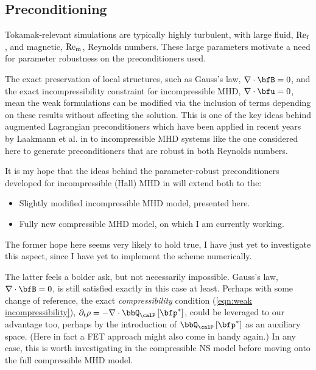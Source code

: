 \subsection*{Preconditioning}
    Tokamak-relevant simulations are typically highly turbulent, with large fluid, $\mathrm{Re}_{\mathrm{f}}$, and magnetic, $\mathrm{Re}_{\mathrm{m}}$, Reynolds numbers. These large parameters motivate a need for parameter robustness on the preconditioners used.

    The exact preservation of local structures, such as Gauss's law, $\nabla\cdot\bfB = 0$, and the exact incompressibility constraint for incompressible MHD, $\nabla\cdot\bfu = 0$, mean the weak formulations can be modified via the inclusion of terms depending on these results without affecting the solution. This is one of the key ideas behind augmented Lagrangian preconditioners \cite{FMW19} which have been applied in recent years by Laakmann et al. in \cite{Laakmann_Farrell_Mitchell_22, Laakmann_Hu_Farrell_2022} to incompressible MHD systems like the one considered here to generate preconditioners that are robust in both Reynolds numbers.

    \begin{remark}
        It is my hope that the ideas behind the parameter-robust preconditioners developed for incompressible (Hall) MHD in \cite{Laakmann_Farrell_Mitchell_22, Laakmann_Hu_Farrell_2022} will extend both to the:
        \begin{itemize}
            \item  Slightly modified incompressible MHD model, presented here.
            \item  Fully new compressible MHD model, on which I am currently working.
        \end{itemize}
        The former hope here seems very likely to hold true, I have just yet to investigate this aspect, since I have yet to implement the scheme numerically.
        
        The latter feels a bolder ask, but not necessarily impossible. Gauss's law, $\nabla\cdot\bfB = 0$, is still satisfied exactly in this case at least. Perhaps with some change of reference, the exact \emph{compressibility} condition (\ref{eqn:weak incompressibility}), $\partial_{t}\rho  =  - \nabla\cdot\bbQ_{\calP}\left[\bfp^{*}\right]$, could be leveraged to our advantage too, perhaps by the introduction of $\bbQ_{\calP}\left[\bfp^{*}\right]$ as an auxiliary space. (Here in fact a FET approach might also come in handy again.) In any case, this is worth investigating in the compressible NS model before moving onto the full compressible MHD model.
    \end{remark}
    
